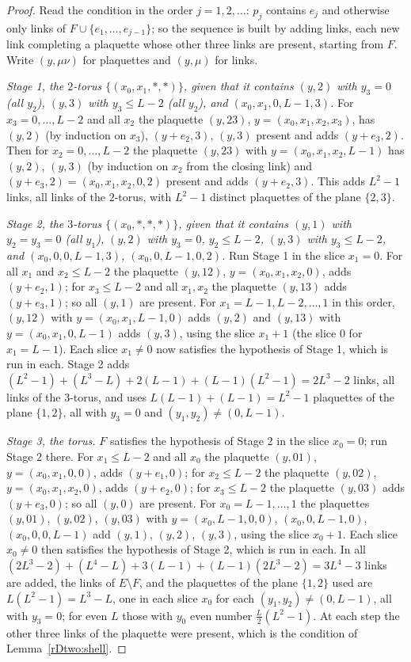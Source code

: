 \begin{proof}
Read the condition in the order $j=1,2,\dots$: $p_j$ contains $e_j$ and
otherwise only links of $F\cup\{e_1,\dots,e_{j-1}\}$; so the sequence is
built by adding links, each new link completing a plaquette whose other
three links are present, starting from $F$. Write $(y,\mu\nu)$ for
plaquettes and $(y,\mu)$ for links.

\emph{Stage 1, the $2$-torus $\{(x_0,x_1,\ast,\ast)\}$, given that it
contains $(y,2)$ with $y_3=0$ (all $y_2$), $(y,3)$ with $y_3\le L-2$ (all
$y_2$), and $(x_0,x_1,0,L-1,3)$.} For $x_3=0,\dots,L-2$ and all $x_2$ the
plaquette $(y,23)$, $y=(x_0,x_1,x_2,x_3)$, has $(y,2)$ (by induction on
$x_3$), $(y+e_2,3)$, $(y,3)$ present and adds $(y+e_3,2)$. Then for $x_2=0,
\dots,L-2$ the plaquette $(y,23)$ with $y=(x_0,x_1,x_2,L-1)$ has $(y,2)$,
$(y,3)$ (by induction on $x_2$ from the closing link) and $(y+e_3,2)=(x_0,x_1,
x_2,0,2)$ present and adds $(y+e_2,3)$. This adds $L^2-1$ links, all links
of the $2$-torus, with $L^2-1$ distinct plaquettes of the plane $\{2,3\}$.

\emph{Stage 2, the $3$-torus $\{(x_0,\ast,\ast,\ast)\}$, given that it
contains $(y,1)$ with $y_2=y_3=0$ (all $y_1$), $(y,2)$ with $y_3=0$, $y_2\le
L-2$, $(y,3)$ with $y_3\le L-2$, and $(x_0,0,0,L-1,3)$, $(x_0,0,L-1,0,2)$.}
Run Stage 1 in the slice $x_1=0$. For all $x_1$ and $x_2\le L-2$ the
plaquette $(y,12)$, $y=(x_0,x_1,x_2,0)$, adds $(y+e_2,1)$; for $x_3\le L-2$
and all $x_1,x_2$ the plaquette $(y,13)$ adds $(y+e_3,1)$; so all $(y,1)$
are present. For $x_1=L-1,L-2,\dots,1$ in this order, $(y,12)$ with $y=(x_0,
x_1,L-1,0)$ adds $(y,2)$ and $(y,13)$ with $y=(x_0,x_1,0,L-1)$ adds $(y,3)$,
using the slice $x_1+1$ (the slice $0$ for $x_1=L-1$). Each slice $x_1\ne0$
now satisfies the hypothesis of Stage 1, which is run in each. Stage 2
adds $(L^2-1)+(L^3-L)+2(L-1)+(L-1)(L^2-1)=2L^3-2$ links, all links of the
$3$-torus, and uses $L(L-1)+(L-1)=L^2-1$ plaquettes of the plane $\{1,2\}$,
all with $y_3=0$ and $(y_1,y_2)\ne(0,L-1)$.

\emph{Stage 3, the torus.} $F$ satisfies the hypothesis of Stage 2 in the
slice $x_0=0$; run Stage 2 there. For $x_1\le L-2$ and all $x_0$ the
plaquette $(y,01)$, $y=(x_0,x_1,0,0)$, adds $(y+e_1,0)$; for $x_2\le L-2$
the plaquette $(y,02)$, $y=(x_0,x_1,x_2,0)$, adds $(y+e_2,0)$; for $x_3\le
L-2$ the plaquette $(y,03)$ adds $(y+e_3,0)$; so all $(y,0)$ are present.
For $x_0=L-1,\dots,1$ the plaquettes $(y,01)$, $(y,02)$, $(y,03)$ with $y=
(x_0,L-1,0,0)$, $(x_0,0,L-1,0)$, $(x_0,0,0,L-1)$ add $(y,1)$, $(y,2)$,
$(y,3)$, using the slice $x_0+1$. Each slice $x_0\ne0$ then satisfies the
hypothesis of Stage 2, which is run in each. In all $(2L^3-2)+(L^4-L)+3(L-1)
+(L-1)(2L^3-2)=3L^4-3$ links are added, the links of $E\setminus F$, and the
plaquettes of the plane $\{1,2\}$ used are $L(L^2-1)=L^3-L$, one in each
slice $x_0$ for each $(y_1,y_2)\ne(0,L-1)$, all with $y_3=0$; for even $L$
those with $y_0$ even number $\frac L2(L^2-1)$. At each step the other three
links of the plaquette were present, which is the condition of
Lemma~\ref{rDtwo:shell}.
\end{proof}

